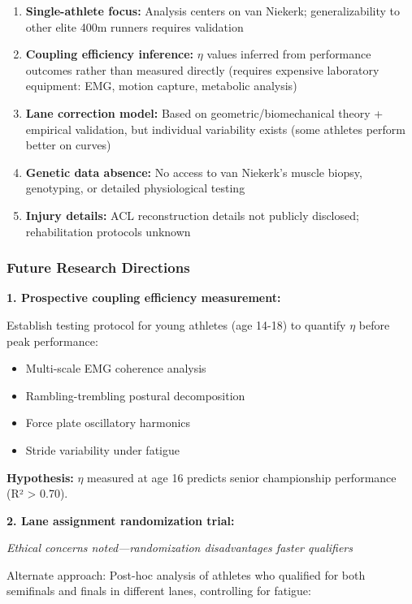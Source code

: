 \begin{enumerate}
    \item \textbf{Single-athlete focus:} Analysis centers on van Niekerk; generalizability to other elite 400m runners requires validation

    \item \textbf{Coupling efficiency inference:} $\eta$ values inferred from performance outcomes rather than measured directly (requires expensive laboratory equipment: EMG, motion capture, metabolic analysis)

    \item \textbf{Lane correction model:} Based on geometric/biomechanical theory + empirical validation, but individual variability exists (some athletes perform better on curves)

    \item \textbf{Genetic data absence:} No access to van Niekerk's muscle biopsy, genotyping, or detailed physiological testing

    \item \textbf{Injury details:} ACL reconstruction details not publicly disclosed; rehabilitation protocols unknown
\end{enumerate}

\subsubsection{Future Research Directions}

\textbf{1. Prospective coupling efficiency measurement:}

Establish testing protocol for young athletes (age 14-18) to quantify $\eta$ before peak performance:
\begin{itemize}
    \item Multi-scale EMG coherence analysis
    \item Rambling-trembling postural decomposition
    \item Force plate oscillatory harmonics
    \item Stride variability under fatigue
\end{itemize}

\textbf{Hypothesis:} $\eta$ measured at age 16 predicts senior championship performance (R² > 0.70).

\textbf{2. Lane assignment randomization trial:}

\textit{Ethical concerns noted—randomization disadvantages faster qualifiers}

Alternate approach: Post-hoc analysis of athletes who qualified for both semifinals and finals in different lanes, controlling for fatigue:

